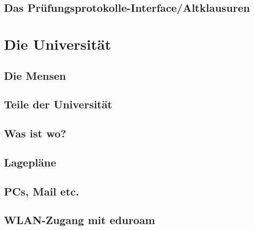 \documentclass[12pt, a4paper]{article}
\newif\ifinfo
\begin{document}
\subsection{Das Prüfungsprotokolle-Interface/Altklausuren}

\ifinfo
\else
	\vfill
\fi

\ifinfo
	\subsection{Praktika}
	
\fi

\pagebreak

\section{Die Universität}
\subsection{Die Mensen}


\subsection{Teile der Universität}
\ifinfo
	
\else
	
\fi

\pagebreak

\subsection{Was ist wo?}
\ifinfo
	
\else
	
\fi

\newpage
\subsection{Lagepläne}
\ifinfo
	
\else
	
\fi
\newpage

\subsection{PCs, Mail etc.}
	
\subsection{WLAN-Zugang mit eduroam}
	
\end{document}
